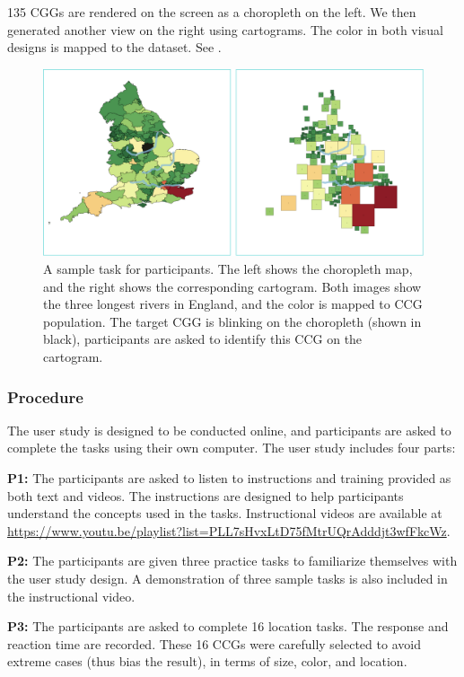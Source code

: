 135 CGGs are rendered on the screen as a choropleth on the left. We then generated another view on the right using cartograms. The color in both visual designs is mapped to the dataset. See .

{
    \begin{figure}[htb!]
        \centering
        \includegraphics[width=\columnwidth,keepaspectratio]{figure/evaluation/task.png}
        \caption{A sample task for participants. The left shows the choropleth map, and the right shows the corresponding cartogram. Both images show the three longest rivers in England, and the color is mapped to CCG population. The target CGG is blinking on the choropleth (shown in black), participants are asked to identify this CCG on the cartogram.}
        \label{fig:task}
    \end{figure}
}

\subsubsection{Procedure}

The user study is designed to be conducted online, and participants are asked to complete the tasks using their own computer. The user study includes four parts:

\textbf{P1:} The participants are asked to listen to instructions and training provided as both text and videos. The instructions are designed to help participants understand the concepts used in the tasks. Instructional videos are available at \url{https://www.youtu.be/playlist?list=PLL7sHvxLtD75fMtrUQrAdddjt3wfFkcWz}.

\textbf{P2:} The participants are given three practice tasks to familiarize themselves with the user study design. A demonstration of three sample tasks is also included in the instructional video.

\textbf{P3:} The participants are asked to complete 16 location tasks. The response and reaction time are recorded. These 16 CCGs were carefully selected to avoid extreme cases (thus bias the result), in terms of size, color, and location.

